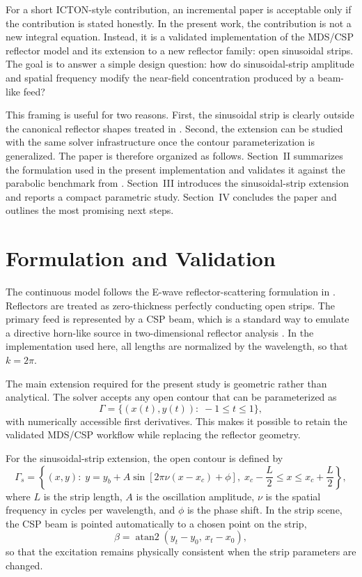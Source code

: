 \documentclass[conference]{IEEEtran}
\begin{document}
For a short ICTON-style contribution, an incremental paper is acceptable only if the contribution is stated honestly. In the present work, the contribution is not a new integral equation. Instead, it is a validated implementation of the MDS/CSP reflector model and its extension to a new reflector family: open sinusoidal strips. The goal is to answer a simple design question: how do sinusoidal-strip amplitude and spatial frequency modify the near-field concentration produced by a beam-like feed?

This framing is useful for two reasons. First, the sinusoidal strip is clearly outside the canonical reflector shapes treated in \cite{nosich2007}. Second, the extension can be studied with the same solver infrastructure once the contour parameterization is generalized. The paper is therefore organized as follows. Section~II summarizes the formulation used in the present implementation and validates it against the parabolic benchmark from \cite{nosich2007}. Section~III introduces the sinusoidal-strip extension and reports a compact parametric study. Section~IV concludes the paper and outlines the most promising next steps.

\section{Formulation and Validation}
The continuous model follows the E-wave reflector-scattering formulation in \cite{nosich2007}. Reflectors are treated as zero-thickness perfectly conducting open strips. The primary feed is represented by a CSP beam, which is a standard way to emulate a directive horn-like source in two-dimensional reflector analysis \cite{deschamps1971,oguzer2002}. In the implementation used here, all lengths are normalized by the wavelength, so that $k = 2\pi$.

The main extension required for the present study is geometric rather than analytical. The solver accepts any open contour that can be parameterized as
\begin{equation}
\Gamma = \{(x(t),y(t)):\; -1 \le t \le 1\},
\end{equation}
with numerically accessible first derivatives. This makes it possible to retain the validated MDS/CSP workflow while replacing the reflector geometry.

For the sinusoidal-strip extension, the open contour is defined by
\begin{equation}
\Gamma_{s} = \left\{(x,y):\;
y = y_{b} + A \sin \left[ 2\pi \nu (x-x_{c}) + \phi \right],\;
x_{c}-\frac{L}{2} \le x \le x_{c}+\frac{L}{2}
\right\},
\label{eq:strip}
\end{equation}
where $L$ is the strip length, $A$ is the oscillation amplitude, $\nu$ is the spatial frequency in cycles per wavelength, and $\phi$ is the phase shift. In the strip scene, the CSP beam is pointed automatically to a chosen point on the strip,
\begin{equation}
\beta = \operatorname{atan2}(y_{t}-y_{0},\,x_{t}-x_{0}),
\label{eq:beta}
\end{equation}
so that the excitation remains physically consistent when the strip parameters are changed.
\end{document}

